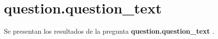 \documentclass{article}
\begin{document}
  \section{ {{ question.question_text }} }

  Se presentan los resultados de la pregunta\textbf{ {{ question.question_text }} }.



\end{document}
